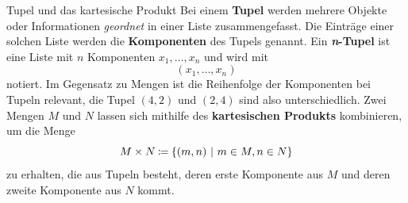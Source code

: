 \documentclass[../../main.tex]{subfiles}
\begin{document}
\begin{nutshell}{Tupel und das kartesische Produkt}
    Bei einem \textbf{Tupel} werden mehrere Objekte oder Informationen \emph{geordnet} in einer Liste zusammengefasst. Die Einträge einer solchen Liste werden die \textbf{Komponenten} des Tupels genannt. Ein \textbf{\emph{n}-Tupel} ist eine Liste mit $n$ Komponenten $x_1,\dots,x_n$ und wird mit \[(x_1,\dots,x_n)\] 
    notiert. Im Gegensatz zu Mengen ist die Reihenfolge der Komponenten bei Tupeln relevant, die Tupel $(4,2)$ und $(2,4)$ sind also unterschiedlich. Zwei Mengen $M$ und $N$ lassen sich mithilfe des \textbf{kartesischen Produkts} kombinieren, um die Menge 
    \[M\times N\mathbin{\coloneqq}\{(m,n)~|~m\in M, n\in N\}\]
    zu erhalten, die aus Tupeln besteht, deren erste Komponente aus $M$ und deren zweite Komponente aus $N$ kommt.
\end{nutshell}
\end{document}

